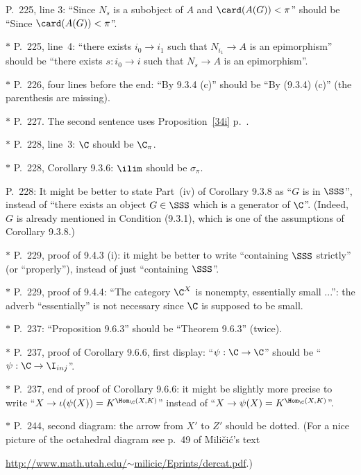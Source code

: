 \documentclass[12pt]{article}
\theoremstyle{remark}
\theoremstyle{definition}
\begin{document}
\begin{s}
P.~225, line 3: ``Since $N_s$ is a subobject of $A$ and $\card(A(G))<\pi$'' should be ``Since $\card(A(G))<\pi$''.

\nn$*$ P.~225, line~4: ``there exists $i_0\to i_1$ such that $N_{i_1}\to A$ is an epimorphism'' should be ``there exists $s:i_0\to i$ such that $N_s\to A$ is an epimorphism''.
\end{s}

\nn$*$ P.~226, four lines before the end: ``By 9.3.4 (c)'' should be ``By (9.3.4) (c)'' (the parenthesis are missing).

\nn$*$ P.~227. The second sentence uses Proposition~\ref{34i} p.~.

\nn$*$ P.~228, line~3: $\C$ should be $\C_\pi$.

\nn$*$ P.~228, Corollary 9.3.6: $\ilim$ should be $\sigma_\pi$.

\begin{s}
P.~228: It might be better to state Part~(iv) of Corollary 9.3.8 as ``$G$ is in $\SSS$'', instead of ``there exists an object $G\in\SSS$ which is a generator of $\C$''. (Indeed, $G$ is already mentioned in Condition (9.3.1), which is one of the assumptions of Corollary 9.3.8.)
\end{s}

\nn$*$ P.~229, proof of 9.4.3 (i): it might be better to write ``containing $\SSS$ strictly'' (or ``properly''), instead of just ``containing $\SSS$''. 

\nn$*$ P.~229, proof of 9.4.4: ``The category $\C^X$ is nonempty, essentially small ...'': the adverb ``essentially'' is not necessary since $\C$ is supposed to be small.

\nn$*$ P.~237: ``Proposition 9.6.3'' should be ``Theorem 9.6.3'' (twice). 

\nn$*$ P.~237, proof of Corollary 9.6.6, first display: ``$\psi:\C\to\C$'' should be ``$\psi:\C\to\I_{inj}$''. 

\nn$*$ P.~237, end of proof of Corollary 9.6.6: it might be slightly more precise to write ``$X\to\iota(\psi(X))=K^{\Hom_\C(X,K)}$'' instead of ``$X\to\psi(X)=K^{\Hom_\C(X,K)}$''.

\nn$*$ P.~244, second diagram: the arrow from $X'$ to $Z'$ should be dotted. (For a nice picture of the octahedral diagram see p.~49 of Mili\v{c}i\'c's text

\href{http://www.math.utah.edu/~milicic/Eprints/dercat.pdf}{http://www.math.utah.edu/$\sim$milicic/Eprints/dercat.pdf}.)
\end{document}
